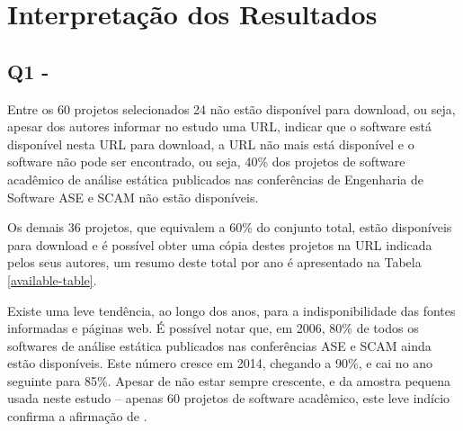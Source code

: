 
%
%
%

\section{Interpretação dos Resultados} \label{estudo1:interpretacao}


\subsection{Q1 - \EstudoUmQuestaoUm}



Entre os 60 projetos selecionados 24 não estão disponível para download, ou
seja, apesar dos autores informar no estudo uma URL, indicar que o software
está disponível nesta URL para download, a URL não mais está disponível e o
software não pode ser encontrado, ou seja, 40\% dos projetos de software
acadêmico de análise estática publicados nas conferências de Engenharia de
Software ASE e SCAM não estão disponíveis.

Os demais 36 projetos, que equivalem a 60\% do conjunto total, estão
disponíveis para download e é possível obter uma cópia destes projetos na URL
indicada pelos seus autores, um resumo deste total por ano é apresentado na
Tabela \ref{available-table}.



Existe uma leve tendência, ao longo dos anos,  para a indisponibilidade das
fontes informadas e páginas web.  É possível notar que, em 2006, 80\% de todos
os softwares de análise estática publicados nas conferências ASE e SCAM ainda
estão disponíveis.  Este número cresce em 2014, chegando a 90\%, e cai no ano
seguinte para 85\%.  Apesar de não estar sempre crescente, e da  amostra
pequena usada neste estudo -- apenas 60 projetos de software acadêmico, este
leve indício confirma a afirmação de .

